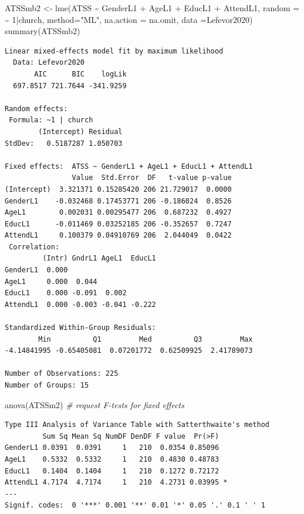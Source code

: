 \documentclass[
  english,
]{book}
\newenvironment{Shaded}{\begin{snugshade}}{\end{snugshade}}
\newcommand{\AttributeTok}[1]{\textcolor[rgb]{0.77,0.63,0.00}{#1}}
\newcommand{\CommentTok}[1]{\textcolor[rgb]{0.56,0.35,0.01}{\textit{#1}}}
\newcommand{\DecValTok}[1]{\textcolor[rgb]{0.00,0.00,0.81}{#1}}
\newcommand{\FunctionTok}[1]{\textcolor[rgb]{0.00,0.00,0.00}{#1}}
\newcommand{\NormalTok}[1]{#1}
\newcommand{\OtherTok}[1]{\textcolor[rgb]{0.56,0.35,0.01}{#1}}
\newcommand{\SpecialCharTok}[1]{\textcolor[rgb]{0.00,0.00,0.00}{#1}}
\newcommand{\StringTok}[1]{\textcolor[rgb]{0.31,0.60,0.02}{#1}}
\begin{document}
\begin{Shaded}
\begin{Highlighting}[]
\NormalTok{ATSSmb2 }\OtherTok{\textless{}{-}} \FunctionTok{lme}\NormalTok{(ATSS }\SpecialCharTok{\textasciitilde{}}\NormalTok{  GenderL1 }\SpecialCharTok{+}\NormalTok{ AgeL1 }\SpecialCharTok{+}\NormalTok{ EducL1 }\SpecialCharTok{+}\NormalTok{ AttendL1, }\AttributeTok{random =} \SpecialCharTok{\textasciitilde{}} \DecValTok{1}\SpecialCharTok{|}\NormalTok{church, }\AttributeTok{method=}\StringTok{"ML"}\NormalTok{, }\AttributeTok{na.action =}\NormalTok{ na.omit, }\AttributeTok{data =}\NormalTok{Lefevor2020)}
\FunctionTok{summary}\NormalTok{(ATSSmb2)}
\end{Highlighting}
\end{Shaded}

\begin{verbatim}
Linear mixed-effects model fit by maximum likelihood
  Data: Lefevor2020 
       AIC      BIC    logLik
  697.8517 721.7644 -341.9259

Random effects:
 Formula: ~1 | church
        (Intercept) Residual
StdDev:   0.5187287 1.050703

Fixed effects:  ATSS ~ GenderL1 + AgeL1 + EducL1 + AttendL1 
                Value  Std.Error  DF   t-value p-value
(Intercept)  3.321371 0.15285420 206 21.729017  0.0000
GenderL1    -0.032468 0.17453771 206 -0.186024  0.8526
AgeL1        0.002031 0.00295477 206  0.687232  0.4927
EducL1      -0.011469 0.03252185 206 -0.352657  0.7247
AttendL1     0.100379 0.04910769 206  2.044049  0.0422
 Correlation: 
         (Intr) GndrL1 AgeL1  EducL1
GenderL1  0.000                     
AgeL1     0.000  0.044              
EducL1    0.000 -0.091  0.002       
AttendL1  0.000 -0.003 -0.041 -0.222

Standardized Within-Group Residuals:
        Min          Q1         Med          Q3         Max 
-4.14841995 -0.65405081  0.07201772  0.62509925  2.41789073 

Number of Observations: 225
Number of Groups: 15 
\end{verbatim}

\begin{Shaded}
\begin{Highlighting}[]
\FunctionTok{anova}\NormalTok{(ATSSm2) }\CommentTok{\# request F{-}tests for fixed effects}
\end{Highlighting}
\end{Shaded}

\begin{verbatim}
Type III Analysis of Variance Table with Satterthwaite's method
         Sum Sq Mean Sq NumDF DenDF F value  Pr(>F)  
GenderL1 0.0391  0.0391     1   210  0.0354 0.85096  
AgeL1    0.5332  0.5332     1   210  0.4830 0.48783  
EducL1   0.1404  0.1404     1   210  0.1272 0.72172  
AttendL1 4.7174  4.7174     1   210  4.2731 0.03995 *
---
Signif. codes:  0 '***' 0.001 '**' 0.01 '*' 0.05 '.' 0.1 ' ' 1
\end{verbatim}
\end{document}
